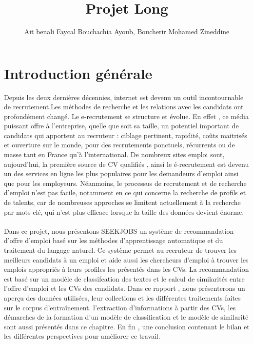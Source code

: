 \documentclass{article}
\title{Projet Long}
\author{Ait benali Faycal
Bouchachia Ayoub, Boucherir Mohamed Zineddine}
\begin{document}
\maketitle
  





\newpage
\hypersetup{linkcolor=black}
\setcounter{tocdepth}{1}
\tableofcontents
{}


\newpage




\section{Introduction générale}


\paragraph{}Depuis les deux dernières décennies,  internet est devenu un outil incontournable de recrutement.Les méthodes de recherche et les relations avec les candidats ont profondément changé. Le e-recrutement se structure et évolue.
En effet , ce média puissant offre à l’entreprise, quelle que soit sa taille, un potentiel important de candidats qui apportent au recruteur : ciblage pertinent, rapidité, coûts maitrisés et ouverture sur le monde, pour des recrutements ponctuels, récurrents ou de masse tant en France qu’à l’international. De nombreux sites emploi sont, aujourd’hui, la première source de CV qualifiés , ainsi le é-recrutement est devenu un des services en ligne les plus populaires pour les demandeurs d'emploi ainsi que pour les employeurs. 
Néanmoins, le processus de recrutement et de recherche d'emploi n'est pas facile, notamment en ce qui concerne la recherche de profils et de talents, car de nombreuses approches se limitent actuellement à la recherche par mots-clé, qui n'est plus efficace lorsque la taille des données devient énorme. 

\paragraph{}Dans ce projet, nous présentons SEEKJOBS un système de recommandation d'offre d'emploi  basé sur les méthodes d'apprentissage automatique et du traitement du langage naturel. Ce système permet au recruteur de trouver les meilleurs candidats à un emploi et aide aussi les chercheurs d'emploi à trouver les emplois appropriés à leurs profiles les présentés dans les CVs. 
La recommandation est basé sur un modèle de classifcation des textes et le calcul de similarités entre l'offre d'emploi et les CVs des candidats. 
Dans ce rapport , nous présenterons un aperçu des données utilisées, leur collections et les différentes traitements faites sur le corpus d'entraînement. l'extraction d'informations à partir des CVs, les démarches de la formation d'un modèle de classification et le modèle de similarité sont aussi présentés dans ce chapitre. 
En fin ,  une conclusion contenant le bilan et les différentes perspectives pour améliorer ce travail. 
\end{document}
